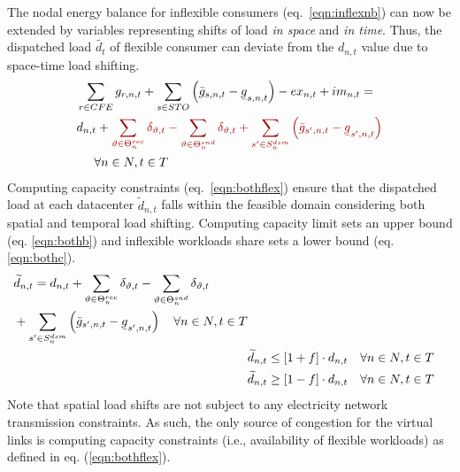 
The nodal energy balance for inflexible consumers (eq.~\ref{eqn:inflexnb}) can now be extended by variables representing shifts of load \textit{in space} and \textit{in time}. Thus, the dispatched load  $\widetilde{d_{t}}$ of flexible consumer can deviate from the $d_{n,t}$ value due to space-time load shifting.
\begin{equation}
    \begin{split}
    &\sum_{r\in CFE} g_{r,n,t} + \sum_{s\in STO} \left(\bar{g}_{s,n,t} - \ubar{g}_{s,n,t}\right) - ex_{n,t} + im_{n,t}  = \\
    & d_{n,t} + \textcolor{darkred}{\sum_{\vartheta \in \Theta_n^{rec}}\delta_{\vartheta, t} - \sum_{\vartheta \in \Theta_n^{snd}}\delta_{\vartheta, t} + \sum_{{s'} \in S_n^{dsm}} \left(\bar{g}_{s',n,t} - \ubar{g}_{s',n,t}\right)} \\
    & \hspace{.5cm} \forall n \in N, t \in T
    \label{eqn:bothnb}
    \end{split}
\end{equation}
Computing capacity constraints (eq.~\ref{eqn:bothflex}) ensure that the dispatched load at each datacenter  $\widetilde{d}_{n,t}$ falls within the feasible domain considering both spatial and temporal load shifting. Computing capacity limit sets an upper bound (eq. \ref{eqn:bothb}) and inflexible workloads share sets a lower bound (eq. \ref{eqn:bothc}).
\begin{subequations}
    \begin{align}
      \begin{split}
        &\widetilde{d}_{n,t} =  d_{n,t} + \sum_{\vartheta \in \Theta_n^{rec}}\delta_{\vartheta, t} - \sum_{\vartheta \in \Theta_n^{snd}}\delta_{\vartheta, t} \\
        &+ \sum_{{s'} \in S_n^{dsm}} \left(\bar{g}_{s',n,t} - \ubar{g}_{s',n,t}\right) \quad \forall n \in N, t \in T \\
      \end{split}
      \label{eqn:botha} \\
      &\widetilde{d}_{n,t} \le [1+f] \cdot d_{n,t}  \quad \forall n \in N, t \in T \label{eqn:bothb} \\
      &\widetilde{d}_{n,t} \ge [1-f] \cdot d_{n,t}  \quad \forall n \in N, t \in T \label{eqn:bothc}
    \end{align}
    \label{eqn:bothflex}
\end{subequations}
Note that spatial load shifts are not subject to any electricity network transmission constraints. As such, the only source of congestion for the virtual links is computing capacity constraints (i.e., availability of flexible workloads) as defined in eq. (\ref{eqn:bothflex}).


